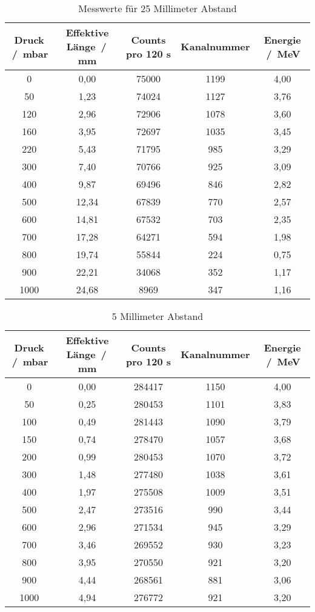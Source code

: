 \begin{table}
  \centering
  \caption{Messwerte für 25 Millimeter Abstand}
  \label{tab:25mm}
  \begin{tabular}{c c c c c}
    \toprule
     Druck \,/\, \si{\milli\bar} & Effektive Länge \,/\, \si{\milli\metre} & Counts pro 120 \si{\second} & Kanalnummer & Energie \,/\, \si{\mega\electronvolt}\\
    \midrule
    0   &  0,00 & 75000 & 1199 & 4,00 \\
    50  &  1,23 & 74024 & 1127 & 3,76 \\
    120 &  2,96 & 72906 & 1078 & 3,60 \\
    160 &  3,95 & 72697 & 1035 & 3,45 \\
    220 &  5,43 & 71795 &  985 & 3,29 \\
    300 &  7,40 & 70766 &  925 & 3,09 \\
    400 &  9,87 & 69496 &  846 & 2,82 \\
    500 & 12,34 & 67839 &  770 & 2,57 \\
    600 & 14,81 & 67532 &  703 & 2,35 \\
    700 & 17,28 & 64271 &  594 & 1,98 \\
    800 & 19,74 & 55844 &  224 & 0,75 \\
    900 & 22,21 & 34068 &  352 & 1,17 \\
    1000& 24,68 & 8969  &  347 & 1,16 \\
    \bottomrule
  \end{tabular}
\end{table}
\begin{table}
  \centering
  \caption{5 Millimeter Abstand}
  \label{tab:5mm}
  \begin{tabular}{c c c c c}
    \toprule
     Druck \,/\, \si{\milli\bar} & Effektive Länge \,/\, \si{\milli\metre} & Counts pro 120 \si{\second} & Kanalnummer & Energie \,/\, \si{\mega\electronvolt}\\
    \midrule
    0   & 0,00 & 284417 & 1150 & 4,00 \\
    50  & 0,25 & 280453 & 1101 & 3,83 \\
    100 & 0,49 & 281443 & 1090 & 3,79 \\
    150 & 0,74 & 278470 & 1057 & 3,68 \\
    200 & 0,99 & 280453 & 1070 & 3,72 \\
    300 & 1,48 & 277480 & 1038 & 3,61 \\
    400 & 1,97 & 275508 & 1009 & 3,51 \\
    500 & 2,47 & 273516 &  990 & 3,44 \\
    600 & 2,96 & 271534 &  945 & 3,29 \\
    700 & 3,46 & 269552 &  930 & 3,23 \\
    800 & 3,95 & 270550 &  921 & 3,20 \\
    900 & 4,44 & 268561 &  881 & 3,06 \\
    1000& 4,94 & 276772 &  921 & 3,20 \\
    \bottomrule
  \end{tabular}
\end{table}
